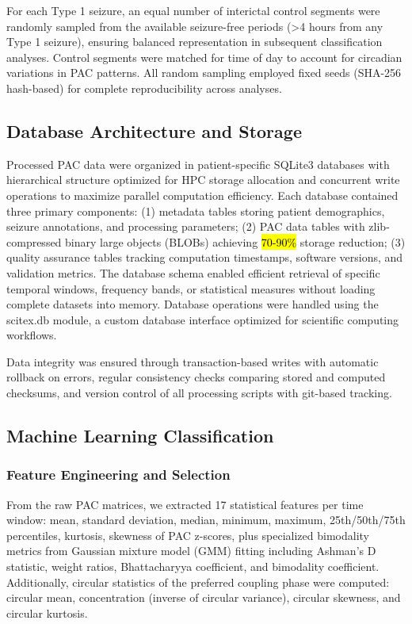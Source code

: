 	For each Type 1 seizure, an equal number of interictal control segments were randomly sampled from the available seizure-free periods (>4 hours from any Type 1 seizure), ensuring balanced representation in subsequent classification analyses. Control segments were matched for time of day to account for circadian variations \hl{\cite{Pip}} in PAC patterns. All random sampling employed fixed seeds (SHA-256 hash-based) for complete reproducibility across analyses.

\subsection{Database Architecture and Storage}
Processed PAC data were organized in patient-specific SQLite3 databases with hierarchical structure optimized for HPC storage allocation and concurrent write operations to maximize parallel computation efficiency. Each database contained three primary components: (1) metadata tables storing patient demographics, seizure annotations, and processing parameters; (2) PAC data tables with zlib-compressed binary large objects (BLOBs) achieving \hl{70-90\%} storage reduction; (3) quality assurance tables tracking computation timestamps, software versions, and validation metrics. The database schema enabled efficient retrieval of specific temporal windows, frequency bands, or statistical measures without loading complete datasets into memory. Database operations were handled using the scitex.db module, a custom database interface optimized for scientific computing workflows.

	Data integrity was ensured through transaction-based writes with automatic rollback on errors, regular consistency checks comparing stored and computed checksums, and version control of all processing scripts with git-based tracking.

\subsection{Machine Learning Classification}
\subsubsection{Feature Engineering and Selection}
From the raw PAC matrices, we extracted 17 statistical features per time window: mean, standard deviation, median, minimum, maximum, 25th/50th/75th percentiles, kurtosis, skewness of PAC z-scores, plus specialized bimodality metrics from Gaussian mixture model (GMM) fitting including Ashman's D statistic, weight ratios, Bhattacharyya coefficient, and bimodality coefficient. Additionally, circular statistics of the preferred coupling phase were computed: circular mean, concentration (inverse of circular variance), circular skewness, and circular kurtosis.

